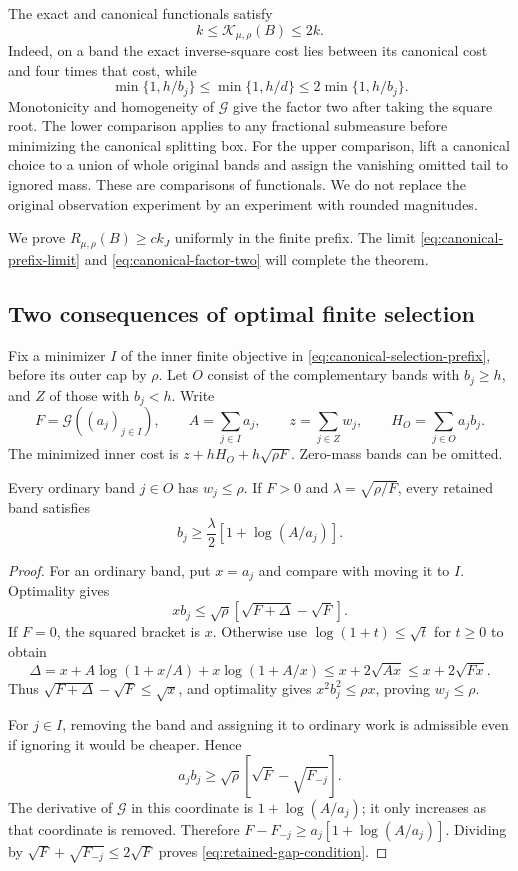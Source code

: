 The exact and canonical functionals satisfy
\begin{equation}\label{eq:canonical-factor-two}
 k\le\mathcal K_{\mu,\rho}(B)\le2k.
\end{equation}
Indeed, on a band the exact inverse-square cost lies between its
canonical cost and four times that cost, while
\[
 \min\{1,h/b_j\}\le\min\{1,h/d\}\le2\min\{1,h/b_j\}.
\]
Monotonicity and homogeneity of $\mathcal G$ give the factor two after
taking the square root. The lower comparison applies to any fractional
submeasure before minimizing the canonical splitting box. For the upper
comparison, lift a canonical choice to a union of whole original bands
and assign the vanishing omitted tail to ignored mass.
These are comparisons of functionals. We do not replace the original
observation experiment by an experiment with rounded magnitudes.

We prove $R_{\mu,\rho}(B)\ge c k_J$ uniformly in the finite prefix.
The limit \eqref{eq:canonical-prefix-limit} and
\eqref{eq:canonical-factor-two} will complete the theorem.

\subsection{Two consequences of optimal finite selection}

Fix a minimizer $I$ of the inner finite objective in
\eqref{eq:canonical-selection-prefix}, before its outer cap by $\rho$.
Let $O$ consist of the complementary bands with $b_j\ge h$, and $Z$ of
those with $b_j<h$. Write
\[
 F=\mathcal G((a_j)_{j\in I}),\qquad A=\sum_{j\in I}a_j,\qquad
 z=\sum_{j\in Z}w_j,\qquad H_O=\sum_{j\in O}a_jb_j.
\]
The minimized inner cost is $z+hH_O+h\sqrt{\rho F}$.
Zero-mass bands can be omitted.

\begin{lemma}\label{lem:optimal-band-inequalities}
Every ordinary band $j\in O$ has $w_j\le\rho$.
If $F>0$ and $\lambda=\sqrt{\rho/F}$, every retained band satisfies
\begin{equation}\label{eq:retained-gap-condition}
 b_j\ge\frac{\lambda}{2}[1+\log(A/a_j)].
\end{equation}
\end{lemma}

\begin{proof}
For an ordinary band, put $x=a_j$ and compare with moving it to $I$.
Optimality gives
\[
 xb_j\le\sqrt\rho[\sqrt{F+\Delta}-\sqrt F].
\]
If $F=0$, the squared bracket is $x$. Otherwise use
$\log(1+t)\le\sqrt t$ for $t\ge0$ to obtain
\[
 \Delta=x+A\log(1+x/A)+x\log(1+A/x)
       \le x+2\sqrt{Ax}\le x+2\sqrt{Fx}.
\]
Thus $\sqrt{F+\Delta}-\sqrt F\le\sqrt x$, and optimality gives
$x^2b_j^2\le\rho x$, proving $w_j\le\rho$.

For $j\in I$, removing the band and assigning it to ordinary work is
admissible even if ignoring it would be cheaper. Hence
\[
 a_jb_j\ge\sqrt\rho[\sqrt F-\sqrt{F_{-j}}].
\]
The derivative of $\mathcal G$ in this coordinate is
$1+\log(A/a_j)$; it only increases as that coordinate is removed.
Therefore
$F-F_{-j}\ge a_j[1+\log(A/a_j)]$.
Dividing by $\sqrt F+\sqrt{F_{-j}}\le2\sqrt F$ proves
\eqref{eq:retained-gap-condition}.
\end{proof}

